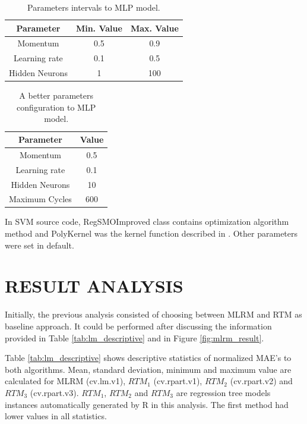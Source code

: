 \documentclass[a4paper,twoside]{article}
\begin{document}
\begin{table}[h]
\caption{Parameters intervals to MLP model.}\label{tab:mlp_configuration_investigation} \centering
\begin{tabular}{|c|c|c|}
  \hline
  Parameter & Min. Value & Max. Value \\
  \hline
  Momentum & 0.5 & 0.9 \\
  \hline
  Learning rate & 0.1 & 0.5 \\
  \hline
  Hidden Neurons & 1 & 100 \\
  \hline
\end{tabular}
\end{table}

\begin{table}[h]
\caption{A better parameters configuration to MLP model.}\label{tab:mlp_best_configuration} \centering
\begin{tabular}{|c|c|}
  \hline
  Parameter & Value \\
  \hline
  Momentum & 0.5 \\
  \hline
  Learning rate & 0.1 \\
  \hline
  Hidden Neurons & 10 \\
  \hline
  Maximum Cycles & 600 \\
  \hline
\end{tabular}
\end{table}

In SVM source code, RegSMOImproved class contains optimization algorithm method and PolyKernel was the kernel function described in \cite{Shevade1999}. Other parameters were set in default.

\section{\uppercase{Result Analysis}}
\label{sec:resultanalysis}

\noindent Initially, the previous analysis consisted of choosing between MLRM and RTM as baseline approach. It could be performed after discussing the information provided in Table \ref{tab:lm_descriptive} and in Figure \ref{fig:mlrm_result}. 

Table \ref{tab:lm_descriptive} shows descriptive statistics of normalized MAE's to both algorithms. Mean, standard deviation, minimum and maximum value are calculated for MLRM (cv.lm.v1), $RTM_1$ (cv.rpart.v1), $RTM_2$ (cv.rpart.v2) and $RTM_3$ (cv.rpart.v3). $RTM_1$, $RTM_2$ and $RTM_3$ are regression tree models instances automatically generated by R in this analysis. The first method had lower values in all statistics.
\end{document}
